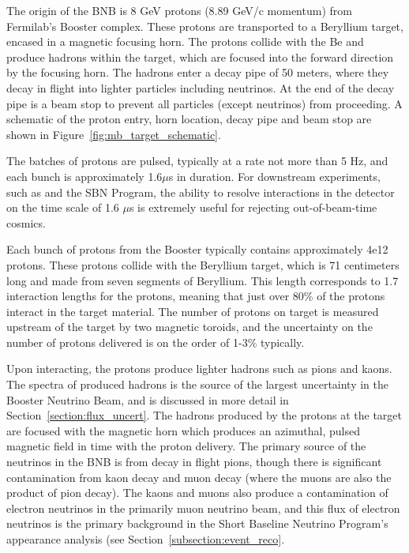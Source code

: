 The origin of the BNB is 8 GeV protons (8.89 GeV/c momentum) from Fermilab's Booster complex.  These protons are transported to a Beryllium target, encased in a magnetic focusing horn.  The protons collide with the Be and produce hadrons within the target, which are focused into the forward direction by the focusing horn.  The hadrons enter a decay pipe of 50 meters, where they decay in flight into lighter particles including neutrinos.  At the end of the decay pipe is a beam stop to prevent all particles (except neutrinos) from proceeding.  A schematic of the proton entry, horn location, decay pipe and beam stop are shown in Figure~\ref{fig:mb_target_schematic}.

The batches of protons are pulsed, typically at a rate  not more than 5 Hz, and each bunch is approximately 1.6$\mu$s in duration.  For downstream experiments, such as \MB and the SBN Program, the ability to resolve interactions in the detector on the time scale of 1.6 $\mu$s is extremely useful for rejecting out-of-beam-time cosmics.  

Each bunch of protons from the Booster typically contains approximately 4e12 protons.  These protons collide with the Beryllium target, which is 71 centimeters long and made from seven segments of Beryllium.  This length corresponds to 1.7 interaction lengths for the protons, meaning that just over 80\% of the protons interact in the target material.  The number of protons on target is measured upstream of the target by two magnetic toroids, and the uncertainty on the number of protons delivered is on the order of 1-3\% typically.

Upon interacting, the protons produce lighter hadrons such as pions and kaons.  The spectra of produced hadrons is the source of the largest uncertainty in the Booster Neutrino Beam, and is discussed in more detail in Section~\ref{section:flux_uncert}.  The hadrons produced by the protons at the target are focused with the magnetic horn which produces an azimuthal, pulsed magnetic field in time with the proton delivery.  The primary source of the neutrinos in the BNB is from decay in flight pions, though there is significant contamination from kaon decay and muon decay (where the muons are also the product of pion decay).  The kaons and muons also produce a contamination of electron neutrinos in the primarily muon neutrino beam, and this flux of electron neutrinos is the primary background in the Short Baseline Neutrino Program's \nue appearance analysis (see Section~\ref{subsection:event_reco}.

